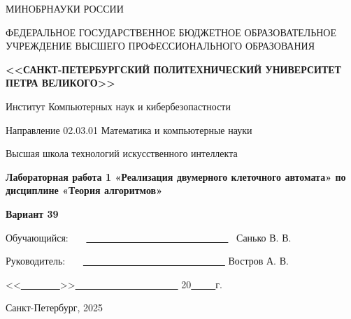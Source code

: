 \documentclass[11pt,a4paper,final]{article}
\begin{document}
	\begin{center}
		{\large МИНОБРНАУКИ РОССИИ}
		\par
		\vspace{8pt}
		{\large ФЕДЕРАЛЬНОЕ ГОСУДАРСТВЕННОЕ БЮДЖЕТНОЕ ОБРАЗОВАТЕЛЬНОЕ УЧРЕЖДЕНИЕ}
		\vspace{7pt} 
		{\large ВЫСШЕГО ПРОФЕССИОНАЛЬНОГО ОБРАЗОВАНИЯ}
		
		\vspace{3pt} 
		{\Large \bf <<САНКТ-ПЕТЕРБУРГСКИЙ ПОЛИТЕХНИЧЕСКИЙ УНИВЕРСИТЕТ ПЕТРА ВЕЛИКОГО>>}
		
		\vspace{1pt}
		{\Large Институт Компьютерных наук и кибербезопастности}
		
		\vspace{1pt} 
		{\Large Направление 02.03.01 Математика и компьютерные науки}
		
		\vspace{1pt} 
		{\Large Высшая школа технологий искусственного интеллекта}
		
		\vspace{40pt}
		{\Huge \bf Лабораторная работа 1 «Реализация двумерного клеточного автомата» по дисциплине «Теория алгоритмов»}
		
		\vspace{10pt}
		{\Huge \bf Вариант 39}
	\end{center}
	
	\vspace{160pt} 
	\hspace{1cm}
	{\large Обучающийся: \ \ \ \underline{\ \ \ \ \ \ \ \ \ \ \ \ \ \ \ \ \ \ \ \ \ \ \ \ \ \ \ \ \ }
		\hspace {2cm}   \ Санько В. В.} 
	
	\vspace{10pt} 
	\hspace{1cm}
	{\large Руководитель: \ \ \ \underline{\ \ \ \ \ \ \ \ \ \ \ \ \ \ \ \ \ \ \ \ \ \ \ \ \ \ \ \ \ } 
		\hspace {2.25cm} Востров А. В.}
	
	\vspace{40pt} 
	\begin{flushright}
		{<<\underline{\ \ \ \ \ \ \ \ }>>\underline{\ \ \ \ \ \ \ \ \ \ \ \ \ \ \ \ \ \ \ \ \ }
			20\underline{\ \ \ \ \ }г.}
	\end{flushright}
	
	\vspace{80pt} 
	\begin{center}
		{\large Санкт-Петербург, 2025}
	\end{center}
	\thispagestyle{empty}
	
\end{document}
